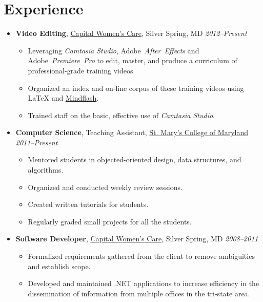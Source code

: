 \documentclass[11pt,letterpaper]{article}
\makeatletter
\newcommand{\position}[5]{\item%
  \begin{tabular*}{1.0\linewidth}{l@{\extracolsep{\fill}}r}
    #1 & #2\\
    \textit{#3} & \textit{#4---#5}
  \end{tabular*}}
\renewcommand{\position}[6][]{%
\item[#1] \hspace*{-2em}\textbf{#4}, #2, #3\hfill
  \textit{#5--#6}\vspace*{-.8em}}
\newcommand{\cwc}{\href{http://www.cwcare.net}{Capital Women's Care}}
\newcommand{\software}[1]{\textsl{#1}}
\newcommand{\smcm}{\href{http://www.smcm.edu}
                        {St. Mary's College of Maryland}}
\makeatother
\begin{document}
\section*{Experience}
\begin{itemize}
\position \cwc
          {Silver Spring, MD}
          {Video Editing}
          {2012}{Present}
          \begin{itemize}
          \item Leveraging \software{Camtasia Studio},
            Adobe~\software{After~Effects} and
            Adobe~\software{Premiere~Pro} to edit, master, and produce
            a curriculum of professional-grade training videos.
          \item Organized an index and on-line corpus of these training
            videos using \LaTeX{} and
            \href{http://www.mindflash.com/}{Mindflash}.
          \item Trained staff on the basic, effective use of
            \software{Camtasia Studio}.
          \end{itemize}

\position {Teaching Assistant}
          {\smcm}
          {Computer Science}
          {2011}{Present}
          \begin{itemize}
          \item Mentored students in objected-oriented design, data
            structures, and algorithms.
          \item Organized and conducted weekly review sessions.
          \item Created written tutorials for students.
          \item Regularly graded small projects for all the students.
          \end{itemize}

\position \cwc
          {Silver Spring, MD}
          {Software Developer}
          {2008}{2011}
          \begin{itemize}
          \item Formalized requirements gathered from the client to
            remove ambiguities and establish scope.
          \item Developed and maintained .NET applications to increase
            efficiency in the dissemination of information from
            multiple offices in the tri-state area.
          \end{itemize}


\end{itemize}
\end{document}

